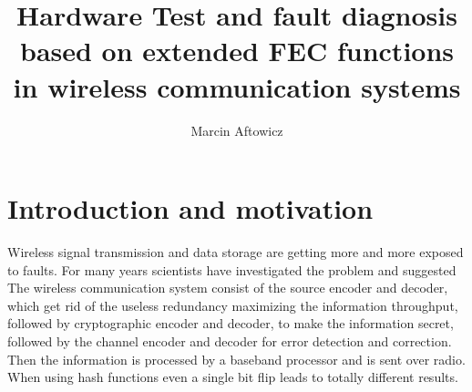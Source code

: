 \documentclass[]{myclass}
\author{Marcin Aftowicz}
\title{Hardware Test and fault diagnosis based on extended FEC functions  in wireless communication systems}
\begin{document}


\frontmatter
\pagestyle{empty}%
\maketitle  \cleardoublepage

   \cleardoublepage

\pagestyle{ppfcmthesis}
    \cleardoublepage

\listoffigures  \cleardoublepage
\listoftables   \cleardoublepage

\tableofcontents \cleardoublepage

\mainmatter
 


\chapter{Introduction and motivation} \label{ch:int}

Wireless signal transmission and data storage are getting more and more exposed to faults. For many years scientists have investigated the problem and suggested 
The wireless communication system consist of the source encoder and decoder, which get rid of the useless redundancy maximizing the information throughput, followed by cryptographic encoder and decoder, to make the information secret, followed by the channel encoder and decoder for error detection and correction. Then the information is processed by a baseband processor and is sent over radio. 
When using hash functions even a single bit flip leads to totally different results.
\end{document}
